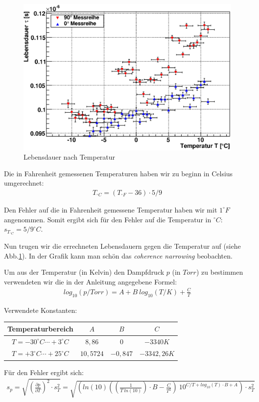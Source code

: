 \documentclass[12pt]{article}
\begin{document}
\begin{figure}[H]  
\centering
\includegraphics[width=0.9\linewidth]{pictures/lebensdauer_temp.eps}
\caption{Lebensdauer nach Temperatur}
\label{leben_temp}
\end{figure}

Die in Fahrenheit gemessenen Temperaturen haben wir zu beginn in Celsius umgerechnet:
\begin{align}
 T_{^\circ C} = (T_{^\circ F} - 36) \cdot 5 / 9
\end{align}

Den Fehler auf die in Fahrenheit gemessene Temperatur haben wir mit $1^\circ F$ angenommen. Somit ergibt sich für den Fehler auf die Temperatur in
$^\circ C$: $s_{T_{^\circ C}} = 5 / 9 ^\circ C$.

Nun trugen wir die errechneten Lebensdauern gegen die Temperatur auf (siehe Abb.\ref{leben_temp}). In der Grafik kann man schön das 
\textit{coherence narrowing} beobachten.

Um aus der Temperatur (in Kelvin) den Dampfdruck $p$ (in $Torr$) zu bestimmen verwendeten wir die in der Anleitung angegebene Formel:
\begin{align}
 log_{10}(p/Torr) = A + B ~ log_{10}(T/K) + \frac{C}{T}
\end{align}

\begin{center}
Verwendete Konstanten: \\
\vspace{20pt}
\begin{tabular}{|c|c|c|c|}
 \hline
 Temperaturbereich&$A$&$B$&$C$\\
 \hline
 $T = -30^\circ C \cdots +3^\circ C$&$8,86$&$0$&$-3340K$ \\
 $T = +3^\circ C \cdots +25^\circ C$&$10,5724$&$-0,847$&$-3342,26K$ \\
 \hline
\end{tabular}

 \vspace{20pt}
\end{center}
Für den Fehler ergibt sich:
\begin{align}
 s_p = \sqrt{(\frac{\partial p}{\partial T})^2\cdot s^2_T} = \sqrt{\left(ln(10)\left(\left(\frac{1}{T~ln(10)}\right)\cdot B - \frac{C}{T^2}
 \right)~10^{C / T + 
 log_{10}(T)\cdot B + A}\right) \cdot s^2_T}
\end{align}
\end{document}
